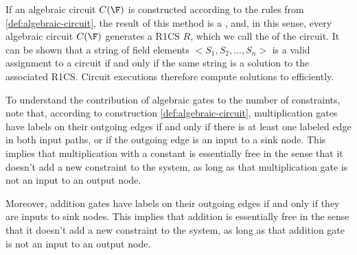If an algebraic circuit $C(\F)$ is constructed according to the rules from \ref{def:algebraic-circuit}, the result of this method is a , and, in this sense, every algebraic circuit $C(\F)$ generates a R1CS $R$, which we call the  of the circuit. It can be shown that a string of field elements $<S_1,S_2,\ldots, S_n>$ is a valid assignment to a circuit if and only if the same string is a solution to the associated R1CS. Circuit executions therefore compute solutions to  efficiently. 

To understand the contribution of algebraic gates to the number of constraints, note that,
according to construction \ref{def:algebraic-circuit}, multiplication gates have labels on their outgoing edges if and only if there is at least one labeled edge in both input paths, or if the outgoing edge is an input to a sink node. This implies that multiplication with a constant is essentially free in the sense that it doesn't add a new constraint to the system, as long as that multiplication gate is not an input to an output node. 

Moreover, addition gates have labels on their outgoing edges if and only if they are inputs to sink nodes. This implies that addition is essentially free in the sense that it doesn't add a new constraint to the system, as long as that addition gate is not an input to an output node. 

